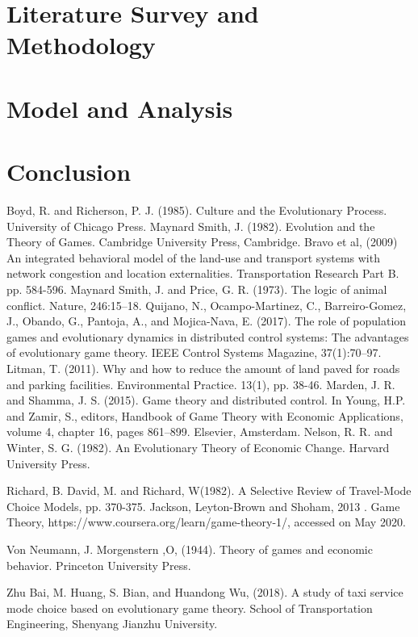 \documentclass[12pt]{report}
\begin{document}
\chapter{Literature Survey and Methodology} 


\chapter{Model and Analysis}


\chapter*{Conclusion}


\begin{thebibliography}{2}
Boyd, R. and Richerson, P. J. (1985). Culture and the Evolutionary Process. University of Chicago Press.
Maynard Smith, J. (1982). Evolution and the Theory of Games. Cambridge University Press, Cambridge.
Bravo et al, (2009) An integrated behavioral model of the land-use and transport systems with network congestion and location externalities. Transportation Research Part B. pp. 584-596.
Maynard Smith, J. and Price, G. R. (1973). The logic of animal conflict. Nature, 246:15–18. 
Quijano, N., Ocampo-Martinez, C., Barreiro-Gomez, J., Obando, G., Pantoja, A., and Mojica-Nava, E. (2017). The role of population games and evolutionary dynamics in distributed control systems: The advantages of evolutionary game theory. IEEE Control Systems Magazine, 37(1):70–97.
Litman, T. (2011). Why and how to reduce the amount of land paved for roads
and parking facilities. Environmental Practice. 13(1), pp. 38-46.
Marden, J. R. and Shamma, J. S. (2015). Game theory and distributed control. In Young, H.P. and Zamir, S., editors, Handbook of Game Theory with Economic Applications, volume 4, chapter 16, pages 861–899. Elsevier, Amsterdam.
Nelson, R. R. and Winter, S. G. (1982). An Evolutionary Theory of Economic Change. Harvard University Press.

Richard, B. David, M. and Richard, W(1982). A Selective Review of Travel-Mode Choice Models, pp. 370-375.
Jackson, Leyton-Brown and Shoham, 2013 . Game Theory, https://www.coursera.org/learn/game-theory-1/, accessed on May 2020. 

Von Neumann, J. Morgenstern ,O, (1944). Theory of games and economic behavior. Princeton University Press.

Zhu Bai, M. Huang, S. Bian, and Huandong Wu, (2018). A study of taxi service mode choice based on evolutionary game theory. School of Transportation Engineering, Shenyang Jianzhu University.
\end{thebibliography}
\end{document}
